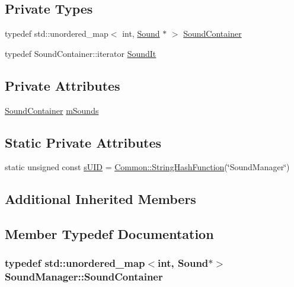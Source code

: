 \subsection*{Private Types}
\begin{DoxyCompactItemize}
\item 
typedef std\+::unordered\+\_\+map$<$ int, \hyperlink{classSound}{Sound} $\ast$ $>$ \hyperlink{classSoundManager_a4a8992fd3df15cb75e6da094f1e485b7}{Sound\+Container}
\item 
typedef Sound\+Container\+::iterator \hyperlink{classSoundManager_ad9d26dc546c029275535007b5c6aefa1}{Sound\+It}
\end{DoxyCompactItemize}
\subsection*{Private Attributes}
\begin{DoxyCompactItemize}
\item 
\hyperlink{classSoundManager_a4a8992fd3df15cb75e6da094f1e485b7}{Sound\+Container} \hyperlink{classSoundManager_a34d41d8281e018dd7fd258fb0bb4cd78}{m\+Sounds}
\end{DoxyCompactItemize}
\subsection*{Static Private Attributes}
\begin{DoxyCompactItemize}
\item 
static unsigned const \hyperlink{classSoundManager_a30cb0ee6c3b0db8593a5fa863825f01a}{s\+U\+ID} = \hyperlink{namespaceCommon_a994c43a8ea7b03968186a635687a6521}{Common\+::\+String\+Hash\+Function}(\char`\"{}Sound\+Manager\char`\"{})
\end{DoxyCompactItemize}
\subsection*{Additional Inherited Members}


\subsection{Member Typedef Documentation}
\subsubsection[{\texorpdfstring{Sound\+Container}{SoundContainer}}]{\setlength{\rightskip}{0pt plus 5cm}typedef std\+::unordered\+\_\+map$<$int, {\bf Sound}$\ast$$>$ {\bf Sound\+Manager\+::\+Sound\+Container}\hspace{0.3cm}{\ttfamily [private]}}\hypertarget{classSoundManager_a4a8992fd3df15cb75e6da094f1e485b7}{}\label{classSoundManager_a4a8992fd3df15cb75e6da094f1e485b7}
